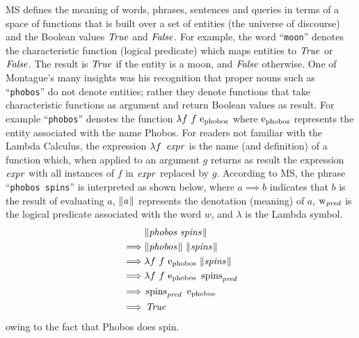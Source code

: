 \documentclass[../main.tex]{subfiles}
\begin{document}
\begin{refsection}
MS \cite{Dowty:wall} defines the meaning of words, phrases, sentences and queries in terms of a space of functions that is
built over a set of entities (the universe of discourse) and the Boolean values $\operatorname{\mathit{True}}$ and $\operatorname{\mathit{False}}$. For
example, the word ``\texttt{moon}'' denotes the characteristic function (logical predicate) which maps entities to
$\operatorname{\mathit{True}}$ or $\operatorname{\mathit{False}}$. The result is $\operatorname{\mathit{True}}$ if the entity is a moon, and $\operatorname{\mathit{False}}$ otherwise. One of Montague's many insights was his recognition that proper nouns such as ``\texttt{phobos}'' do not denote entities; rather they
denote functions that take characteristic functions as argument and return Boolean values as result. For
example ``\texttt{phobos}'' denotes the function $\lambda f \  f \  \mathrm{e}_{\operatorname{\operatorname{phobos}}}$ where $\mathrm{e}_{\operatorname{\operatorname{phobos}}}$ represents the entity associated with
the name Phobos. For readers not familiar with the Lambda Calculus, the expression $\lambda f \ \opit{expr}$ is the
name (and definition) of a function which, when applied to an argument $g$ returns as result the
expression $\operatorname{\mathit{expr}}$ with all instances of $f$ in $\operatorname{\mathit{expr}}$ replaced by $g$. According to MS, the phrase ``\texttt{phobos
spins}'' is interpreted as shown below, where $a \implies b$ indicates that $b$ is the result of evaluating $a$, $\lVert\textit{a\hspace{0.1em}}\rVert$
represents the denotation (meaning) of $a$, $\operatorname{w}_{\operatorname{\mathit{pred}}}$ is the logical predicate associated with the word $w$,
and $\lambda$ is the Lambda symbol.
\begin{equation*}
	\begin{split}
		& \meaningof{phobos spins} \\
		\implies&  \meaningof{phobos}\ \meaningof{spins} \\
		\implies&  \lambda f\ f \ \entityassoc{phobos} \ \meaningof{spins} \\
		\implies&  \lambda f\ f \ \entityassoc{phobos} \ \wordpred{spins} \\
		\implies&  \wordpred{\spins} \ \entityassoc{phobos} \\
		\implies&  \True
	\end{split}
\end{equation*}
owing to the fact that Phobos does spin.


\end{refsection}
\end{document}

